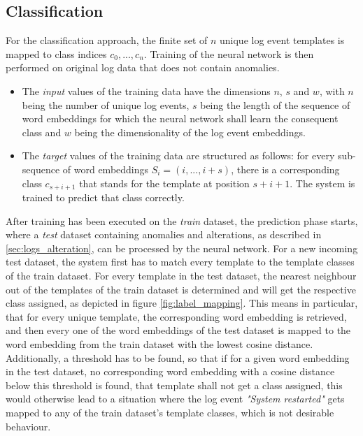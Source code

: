 \subsection{Classification \label{sec:classification}}
For the classification approach, the finite set of $n$ unique log event templates is mapped to class indices $c_0, ..., c_n$. Training of the neural network is then performed on original log data that does not contain anomalies.
\begin{itemize}
\setlength\itemsep{-0.5em}
	\item The \textit{input} values of the training data have the dimensions $n$, $s$ and $w$, with $n$ being the number of unique log events, $s$ being the length of the sequence of word embeddings for which the neural network shall learn the consequent class and $w$ being the dimensionality of the log event embeddings.
	\item The \textit{target} values of the training data are structured as follows: for every sub-sequence of word embeddings $S_i = (i, ..., i+s)$, there is a corresponding class $c_{s+i+1}$ that stands for the template at position $s+i+1$. The system is trained to predict that class correctly.
\end{itemize}

After training has been executed on the \textit{train} dataset, the prediction phase starts, where a \textit{test} dataset containing anomalies and alterations, as described in \ref{sec:logs_alteration}, can be processed by the neural network. For a new incoming test dataset, the system first has to match every template to the template classes of the train dataset. For every template in the test dataset, the nearest neighbour out of the templates of the train dataset is determined and will get the respective class assigned, as depicted in figure \ref{fig:label_mapping}. This means in particular, that for every unique template, the corresponding word embedding is retrieved, and then every one of the word embeddings of the test dataset is mapped to the word embedding from the train dataset with the lowest cosine distance. Additionally, a threshold has to be found, so that if for a given word embedding in the test dataset, no corresponding word embedding with a cosine distance below this threshold is found, that template shall not get a class assigned, this would otherwise lead to a situation where the log event \textit{"System restarted"} gets mapped to any of the train dataset's template classes, which is not desirable behaviour.

